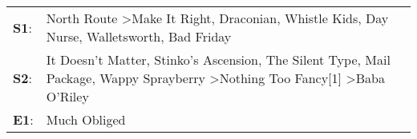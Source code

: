 \begin{supertabular}{p{0.03\textwidth}p{0.92\textwidth}}
 \textbf{S1}:  &                                                North Route\textsuperscript{} \textgreater \enspace Make It Right\textsuperscript{}, \enspace Draconian\textsuperscript{}, \enspace Whistle Kids\textsuperscript{}, \enspace Day Nurse\textsuperscript{}, \enspace Walletsworth\textsuperscript{}, \enspace Bad Friday\textsuperscript{}  \enspace  \\
 \textbf{S2}:  &  It Doesn't Matter\textsuperscript{}, \enspace Stinko's Ascension\textsuperscript{}, \enspace The Silent Type\textsuperscript{}, \enspace Mail Package\textsuperscript{}, \enspace Wappy Sprayberry\textsuperscript{} \textgreater \enspace Nothing Too Fancy[1]\textsuperscript{} \textgreater \enspace Baba O'Riley\textsuperscript{}  \enspace  \\
 \textbf{E1}:  &                                                                                                                                                                                                                                                                                                          Much Obliged\textsuperscript{}  \enspace  \\
\end{supertabular}
